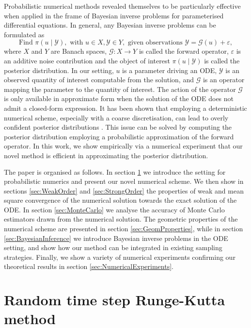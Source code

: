\documentclass{siamart1116}
\numberwithin{theorem}{section}
\newcommand{\epl}{\varepsilon}
\newcommand{\corr}[1]{{\color{bordeaux}#1}}
\begin{document}
Probabilistic numerical methods revealed themselves to be particularly effective when applied in the frame of Bayesian inverse problems \corr{for} parameterised differential equations. In general, any Bayesian inverse problems can be formulated as 
\begin{equation*}
	\text{Find } \pi(u\mid \mathcal{Y}), \text{ with } u \in X, \mathcal{Y} \in Y, \text{ given observations } \mathcal{Y} = \mathcal{G}(u) + \epl,
\end{equation*}
where $X$ and $Y$ are Banach spaces, $\mathcal{G}\colon X \to Y$ is called the forward operator, $\epl$ is an additive noise contribution and the object of interest $\pi(u\mid\mathcal{Y})$ is called the posterior distribution. In our setting, $u$ is a parameter driving an ODE, $\mathcal{Y}$ is an observed quantity of interest computable from the solution, and $\mathcal{G}$ is an operator mapping the parameter to the quantity of interest. \corr{The action of the operator $\mathcal{G}$ is only available in approximate form} when the solution of the ODE does not admit a closed-form expression. It has been shown that employing a deterministic numerical scheme, especially with a coarse discretisation, can lead to overly confident posterior distributions \cite{CGS16,COS17}. This issue can be solved by computing the posterior distribution employing a probabilistic approximation of the forward operator. In this work, we show empirically via a numerical experiment that our novel method is \corr{efficient in approximating the posterior distribution}.

The paper is organised as follows. In section \ref{sec:MethodIntro} we introduce \corr{the setting for probabilistic numerics} and present our novel numerical scheme. We \corr{then} show in sections \ref{sec:WeakOrder} and \ref{sec:StrongOrder} the properties of weak and mean square convergence of the numerical solution towards the exact solution of the ODE. In section \ref{sec:MonteCarlo} we analyse the accuracy of Monte Carlo estimators drawn from the numerical solution. The geometric properties of the numerical scheme are presented in section \ref{sec:GeomProperties}, \corr{while in} section \ref{sec:BayesianInference} we introduce Bayesian inverse problems in the ODE setting, and show how our method can be integrated in existing sampling strategies. Finally, we show a variety of numerical experiments confirming our theoretical results in section \ref{sec:NumericalExperiments}.



\section{\corr{Random time step Runge-Kutta method}}\label{sec:MethodIntro}
\end{document}
